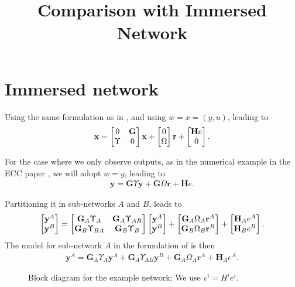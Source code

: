 \documentclass[11pt,a4paper]{article}
\title{Comparison with Immersed Network}
\begin{document}
\maketitle

\section{Immersed network}




Using the same formulation as in \cite{Dankers_predictor_input}, and using $w = x = (y,u)$,
leading to
\begin{align*}
   \mathbf x = \begin{bmatrix} 0 & \mathbf G \\ \Upsilon & 0 \end{bmatrix} \mathbf x + \begin{bmatrix} 0 \\ \Omega \end{bmatrix} \mathbf r + \begin{bmatrix} \mathbf H e \\ 0 \end{bmatrix}.
\end{align*}

For the case where we only observe outputs, as in the numerical example in the ECC paper \cite{ECC_subnets}, we will adopt $w = y$, leading to
\begin{align*}
    \mathbf y = \mathbf G \Upsilon \mathbf y + \mathbf G \Omega \mathbf r +  \mathbf H e.
\end{align*}

Partitioning it in sub-networks $A$ and $B$, leads to
\begin{align*}
    \begin{bmatrix} \mathbf y^A \\ \mathbf y^B \end{bmatrix} = \begin{bmatrix} \mathbf G_A \Upsilon_A & \mathbf G_A \Upsilon_{AB} \\ \mathbf G_B \Upsilon_{BA} & \mathbf G_B \Upsilon_B \end{bmatrix} \begin{bmatrix} \mathbf y^A \\ \mathbf y^B \end{bmatrix} + \begin{bmatrix} \mathbf G_A  \Omega_A \mathbf r^A \\ \mathbf G_B \Omega_B \mathbf r^B \end{bmatrix} + \begin{bmatrix} \mathbf H_A e^A \\ \mathbf H_B e^B \end{bmatrix}.
\end{align*}
The model for sub-network $A$ in the formulation of \cite{Dankers_predictor_input} is then
\begin{align*}
    \mathbf y^A = \mathbf G_A \Upsilon_A \mathbf y^A + \mathbf G_A \Upsilon_{AB} \mathbf y^B + \mathbf G_A  \Omega_A \mathbf r^A + \mathbf H_A e^A.
\end{align*}


\begin{figure}[htbp]
\begin{center}
\resizebox{1\textwidth}{!}{
}
\end{center}
\caption{Block diagram for the example network; We use $v^i = H^ie^i$.}
\centering
\label{fig:network_num_example}
\end{figure}
\end{document}
